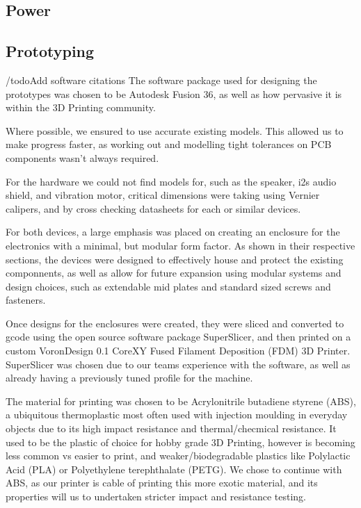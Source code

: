         \subsection{Power}
        \label{subsec: Power}

        \subsection{Prototyping}
        \label{subsec: Prototyping}
        
            /todo{Add software citations}
            The software package used for designing the prototypes was chosen to be Autodesk Fusion 36, as well as how pervasive it is within the 3D Printing community.

            Where possible, we ensured to use accurate existing models. This allowed us to make progress faster, as working out and modelling tight tolerances on PCB components wasn't always required. 

            For the hardware we could not find models for, such as the speaker, i2s audio shield, and vibration motor, critical dimensions were taking using Vernier calipers, and by cross checking datasheets for each or similar devices.

            For both devices, a large emphasis was placed on creating an enclosure for the electronics with a minimal, but modular form factor. As shown in their respective sections, the devices were designed to effectively house and protect the existing componnents, as well as allow for future expansion using modular systems and design choices, such as extendable mid plates and standard sized screws and fasteners.

            Once designs for the enclosures were created, they were sliced and converted to gcode using the open source software package SuperSlicer, and then printed on a custom VoronDesign 0.1 CoreXY Fused Filament Deposition (FDM) 3D Printer. SuperSlicer was chosen due to our teams experience with the software, as well as already having a previously tuned profile for the machine.

            The material for printing was chosen to be Acrylonitrile butadiene styrene (ABS), a ubiquitous thermoplastic most often used with injection moulding in everyday objects due to its high impact resistance and thermal/checmical resistance. It used to be the plastic of choice for hobby grade 3D Printing, however is becoming less common vs easier to print, and weaker/biodegradable plastics like Polylactic Acid (PLA) or Polyethylene terephthalate (PETG). We chose to continue with ABS, as our printer is cable of printing this more exotic material, and its properties will us to undertaken stricter impact and resistance testing.

